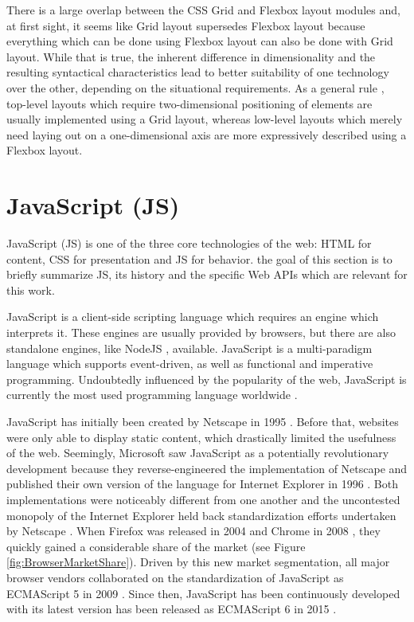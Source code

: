 There is a large overlap between the CSS Grid and Flexbox layout modules and, at first sight, it seems like Grid layout supersedes Flexbox layout because everything which can be done using Flexbox layout can also be done with Grid layout. 
While that is true, the inherent difference in dimensionality and the resulting syntactical characteristics lead to better suitability of one technology over the other, depending on the situational requirements. 
As a general rule \parencite{CSSGridVsFlexbox}, top-level layouts which require two-dimensional positioning of elements are usually implemented using a Grid layout, whereas low-level layouts which merely need laying out on a one-dimensional axis are more expressively described using a Flexbox layout.

\section{JavaScript (JS)}
\label{sec:JS}

JavaScript (JS) is one of the three core technologies of the web: HTML for content, CSS for presentation and JS for behavior. 
the goal of this section is to briefly summarize JS, its history and the specific Web APIs which are relevant for this work.

JavaScript is a client-side scripting language which requires an engine which interprets it. 
These engines are usually provided by browsers, but there are also standalone engines, like NodeJS \parencite{NodeJS}, available. 
JavaScript is a multi-paradigm language which supports event-driven, as well as functional and imperative programming.
Undoubtedly influenced by the popularity of the web, JavaScript is currently the most used programming language worldwide \parencite{StatisticProgrammingLanguageUsage}.

JavaScript has initially been created by Netscape in 1995 \parencite{JSFirstRelease}.
Before that, websites were only able to display static content, which drastically limited the usefulness of the web. 
Seemingly, Microsoft saw JavaScript as a potentially revolutionary development because they reverse-engineered the implementation of Netscape and published their own version of the language for Internet Explorer in 1996 \parencite{JSIERelease}. 
Both implementations were noticeably different from one another and the uncontested monopoly of the Internet Explorer \parencite{BrowserMarketShareEarly} held back standardization efforts undertaken by Netscape \parencite{ECMAScript1}. 
When Firefox was released in 2004 \parencite{FirefoxFirstRelease} and Chrome in 2008 \parencite{ChromeFirstRelease}, they quickly gained a considerable share of the market \parencite{BrowserMarketShare} (see Figure \ref{fig:BrowserMarketShare}).
Driven by this new market segmentation, all major browser vendors collaborated on the standardization of JavaScript as ECMAScript 5 in 2009 \parencite{ECMAScript5}. 
Since then, JavaScript has been continuously developed with its latest version has been released as ECMAScript 6 in 2015 \parencite{ECMAScript6}.

